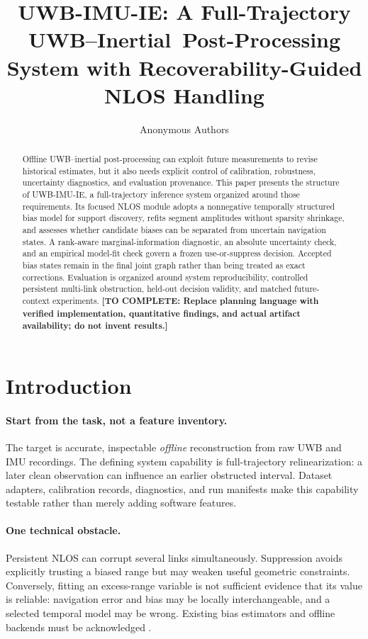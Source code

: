 \documentclass[conference]{IEEEtran}
\title{UWB-IMU-IE: A Full-Trajectory UWB--Inertial\
Post-Processing System with Recoverability-Guided NLOS Handling}
\author{Anonymous Authors}
\newcommand{\todo}[1]{\textcolor{red!70!black}{\textbf{[TO COMPLETE: #1]}}}
\begin{document}
\maketitle

\begin{abstract}
Offline UWB--inertial post-processing can exploit future measurements to revise historical estimates, but it also needs explicit control of calibration, robustness, uncertainty diagnostics, and evaluation provenance. This paper presents the structure of UWB-IMU-IE, a full-trajectory inference system organized around those requirements. Its focused NLOS module adopts a nonnegative temporally structured bias model for support discovery, refits segment amplitudes without sparsity shrinkage, and assesses whether candidate biases can be separated from uncertain navigation states. A rank-aware marginal-information diagnostic, an absolute uncertainty check, and an empirical model-fit check govern a frozen use-or-suppress decision. Accepted bias states remain in the final joint graph rather than being treated as exact corrections. Evaluation is organized around system reproducibility, controlled persistent multi-link obstruction, held-out decision validity, and matched future-context experiments. \todo{Replace planning language with verified implementation, quantitative findings, and actual artifact availability; do not invent results.}
\end{abstract}

\section{Introduction}
\label{sec:intro}
\paragraph{Start from the task, not a feature inventory.}
The target is accurate, inspectable \emph{offline} reconstruction from raw UWB and IMU recordings. The defining system capability is full-trajectory relinearization: a later clean observation can influence an earlier obstructed interval. Dataset adapters, calibration records, diagnostics, and run manifests make this capability testable rather than merely adding software features.

\paragraph{One technical obstacle.}
Persistent NLOS can corrupt several links simultaneously. Suppression avoids explicitly trusting a biased range but may weaken useful geometric constraints. Conversely, fitting an excess-range variable is not sufficient evidence that its value is reliable: navigation error and bias may be locally interchangeable, and a selected temporal model may be wrong. Existing bias estimators and offline backends must be acknowledged \cite{tan2026,yu2026,lu2026}.
\end{document}
